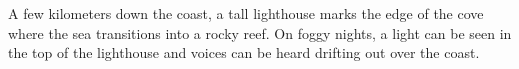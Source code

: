 A few kilometers down the coast, a tall lighthouse marks the edge of the cove where the sea transitions into a rocky reef.
On foggy nights, a light can be seen in the top of the lighthouse and voices can be heard drifting out over the coast.
